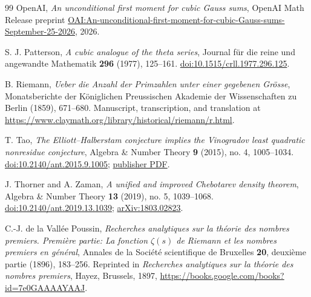 \begin{thebibliography}{99}
OpenAI,
\emph{An unconditional first moment for cubic Gauss sums},
OpenAI Math Release preprint
\href{https://github.com/openai/math/blob/main/preprints/An-unconditional-first-moment-for-cubic-Gauss-sums-September-25-2026/paper.pdf}{OAI:An-unconditional-first-moment-for-cubic-Gauss-sums-September-25-2026},
2026.

S. J. Patterson,
\emph{A cubic analogue of the theta series},
Journal f\"ur die reine und angewandte Mathematik \textbf{296} (1977),
125--161.
\href{https://doi.org/10.1515/crll.1977.296.125}{doi:10.1515/crll.1977.296.125}.

B. Riemann,
\emph{Ueber die Anzahl der Primzahlen unter einer gegebenen Gr\"osse},
Monatsberichte der K\"oniglichen Preussischen Akademie der Wissenschaften
zu Berlin (1859), 671--680.
Manuscript, transcription, and translation at
\url{https://www.claymath.org/library/historical/riemann/r.html}.

T. Tao,
\emph{The Elliott--Halberstam conjecture implies the Vinogradov least
quadratic nonresidue conjecture},
Algebra \& Number Theory \textbf{9} (2015), no. 4, 1005--1034.
\href{https://doi.org/10.2140/ant.2015.9.1005}{doi:10.2140/ant.2015.9.1005};
\href{https://msp.org/ant/2015/9-4/ant-v9-n4-p09-p.pdf}{publisher PDF}.

J. Thorner and A. Zaman,
\emph{A unified and improved Chebotarev density theorem},
Algebra \& Number Theory \textbf{13} (2019), no. 5, 1039--1068.
\href{https://doi.org/10.2140/ant.2019.13.1039}{doi:10.2140/ant.2019.13.1039};
\href{https://arxiv.org/abs/1803.02823}{arXiv:1803.02823}.

C.-J. de la Vall\'ee Poussin,
\emph{Recherches analytiques sur la th\'eorie des nombres premiers.
Premi\`ere partie: La fonction $\zeta(s)$ de Riemann et les nombres
premiers en g\'en\'eral},
Annales de la Soci\'et\'e scientifique de Bruxelles \textbf{20},
deuxi\`eme partie (1896), 183--256.
Reprinted in \emph{Recherches analytiques sur la th\'eorie des nombres
premiers}, Hayez, Brussels, 1897,
\url{https://books.google.com/books?id=7e0GAAAAYAAJ}.

\end{thebibliography}

